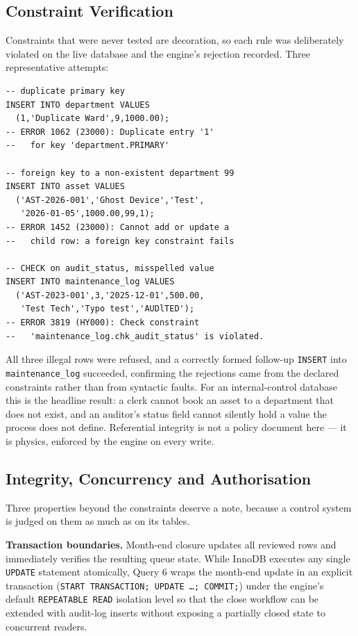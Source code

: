 \documentclass[conference]{IEEEtran}
\begin{document}
\subsection{Constraint Verification}
Constraints that were never tested are decoration, so each rule was
deliberately violated on the live database and the engine's rejection
recorded. Three representative attempts:

\begin{lstlisting}[style=sqlstyle, caption={Constraint tests and MySQL's actual responses}, label={lst:constraint}]
-- duplicate primary key
INSERT INTO department VALUES
  (1,'Duplicate Ward',9,1000.00);
-- ERROR 1062 (23000): Duplicate entry '1'
--   for key 'department.PRIMARY'

-- foreign key to a non-existent department 99
INSERT INTO asset VALUES
  ('AST-2026-001','Ghost Device','Test',
   '2026-01-05',1000.00,99,1);
-- ERROR 1452 (23000): Cannot add or update a
--   child row: a foreign key constraint fails

-- CHECK on audit_status, misspelled value
INSERT INTO maintenance_log VALUES
  ('AST-2023-001',3,'2025-12-01',500.00,
   'Test Tech','Typo test','AUDlTED');
-- ERROR 3819 (HY000): Check constraint
--   'maintenance_log.chk_audit_status' is violated.
\end{lstlisting}

All three illegal rows were refused, and a correctly formed follow-up
\texttt{INSERT} into \texttt{maintenance\_log} succeeded, confirming the
rejections came from the declared constraints rather than from syntactic
faults. For an internal-control database this is the headline result: a
clerk cannot book an asset to a department that does not exist, and an
auditor's status field cannot silently hold a value the process does not
define. Referential integrity is not a policy document here --- it is
physics, enforced by the engine on every write.

\subsection{Integrity, Concurrency and Authorisation}
Three properties beyond the constraints deserve a note, because a control
system is judged on them as much as on its tables.

\textbf{Transaction boundaries.} Month-end closure updates all reviewed rows
and immediately verifies the resulting queue state. While InnoDB executes any
single \texttt{UPDATE} statement atomically, Query 6 wraps the month-end
update in an explicit transaction (\texttt{START TRANSACTION; UPDATE \dots;
COMMIT;}) under the engine's default \texttt{REPEATABLE READ} isolation level
so that the close workflow can be extended with audit-log inserts without
exposing a partially closed state to concurrent readers.
\end{document}
